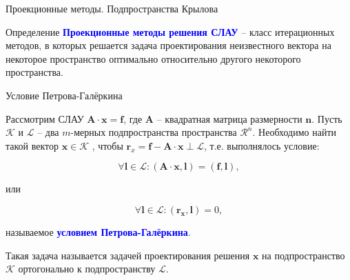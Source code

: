 \documentclass[10pt,xcolor=pst,aspectratio=169]{beamer}
\begin{document}
\begin{frame}{Проекционные методы. Подпространства Крылова}

	\transdissolve[duration=0.2]
	\large
	\begin{block}{Определение}
		\justifying
		\textbf{\textcolor{blue}{Проекционные методы решения СЛАУ}} -- класс итерационных методов, в которых решается задача проектирования неизвестного вектора на некоторое пространство оптимально относительно другого некоторого пространства.
	\end{block}

\end{frame}

\begin{frame}{Условие Петрова-Галёркина}

	\transdissolve[duration=0.2]
	\justifying
	Рассмотрим СЛАУ $\textbf{A} \cdot \textbf{x} = \textbf{f}$, где $\textbf{A}$ -- квадратная матрица размерности $\textbf{n}$. Пусть $\mathcal{K}$ и $\mathcal{L}$ -- два $m$-мерных подпространства пространства $\mathcal{R}^n$. Необходимо найти такой вектор $\textbf{x} \in \mathcal{K}$ , чтобы $\textbf{r}_{x} = \textbf{f} - \textbf{A} \cdot \textbf{x} \perp \mathcal{L}$, т.е. выполнялось условие:
	\begin{block}{}
		\begin{equation}
			\forall \textbf{l} \in \mathcal{L}: (\textbf{A} \cdot \textbf{x} , \textbf{l}) = (\textbf{f} , \textbf{l}),
		\end{equation}
	\end{block}
	или
	\begin{block}{}
		\begin{equation}
			\forall \textbf{l} \in \mathcal{L}: (\textbf{r}_{\textbf{x}} , \textbf{l}) = 0,
		\end{equation}
	\end{block}
	называемое \textbf{\textcolor{blue}{условием Петрова-Галёркина}}.\\
	\begin{block}{}
		Такая задача называется задачей проектирования решения $\textbf{x}$ на подпространство $\mathcal{K}$ ортогонально к подпространству $\mathcal{L}$.
	\end{block}

\end{frame}
\end{document}
